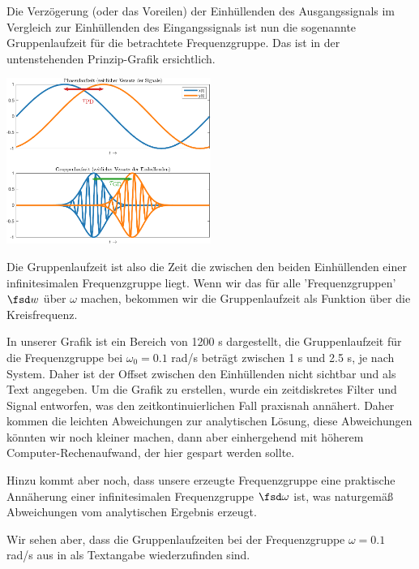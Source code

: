 \begin{Loesung}
Die Verzögerung (oder das Voreilen)
der Einhüllenden des Ausgangssignals im Vergleich zur Einhüllenden des
Eingangssignals ist nun die sogenannte Gruppenlaufzeit für die betrachtete
Frequenzgruppe. Das ist in der untenstehenden Prinzip-Grafik ersichtlich.
\begin{center}
\includegraphics[width=0.5\textwidth]{../system_properties_ct/PhasenGruppenlaufzeit.pdf}
\end{center}
Die Gruppenlaufzeit ist also die Zeit die zwischen den beiden Einhüllenden
einer infinitesimalen Frequenzgruppe liegt. Wenn wir das für alle 'Frequenzgruppen'
$\fsd w$ über $\omega$ machen, bekommen wir die Gruppenlaufzeit als Funktion
über die Kreisfrequenz.

In unserer Grafik ist ein Bereich von 1200 s dargestellt, die Gruppenlaufzeit
für die Frequenzgruppe bei $\omega_0=0.1$ rad/s beträgt zwischen 1 s und 2.5 s, je
nach System. Daher ist der Offset zwischen den Einhüllenden nicht sichtbar
und als Text angegeben.
Um die Grafik zu erstellen, wurde ein zeitdiskretes Filter und Signal entworfen,
was den zeitkontinuierlichen Fall praxisnah annähert. Daher kommen die
leichten Abweichungen zur analytischen Lösung, diese Abweichungen könnten wir
noch kleiner machen, dann aber einhergehend mit höherem Computer-Rechenaufwand,
der hier gespart werden sollte.

Hinzu kommt aber noch, dass unsere erzeugte Frequenzgruppe eine praktische
Annäherung einer infinitesimalen Frequenzgruppe $\fsd \omega$ ist, was naturgemäß
Abweichungen vom analytischen Ergebnis erzeugt.

Wir sehen aber, dass die Gruppenlaufzeiten bei der Frequenzgruppe
$\omega=0.1$ rad/s aus  in
 als Textangabe wiederzufinden sind.
\end{Loesung}

